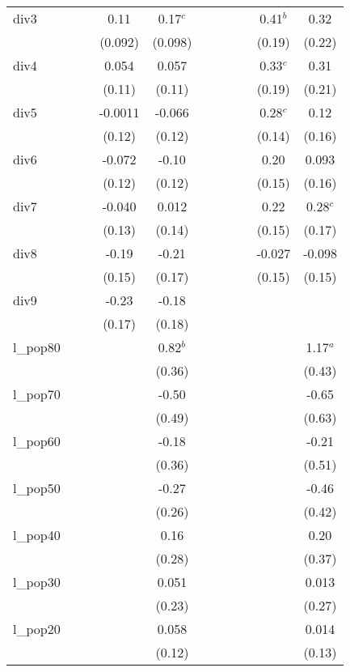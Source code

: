\documentclass[]{article}
\begin{document}
\begin{tabular}{lcccccccccc}
div3 &  &  & 0.11 & 0.17$^c$ &  &  &  &  & 0.41$^b$ & 0.32 \\
 &  &  & (0.092) & (0.098) &  &  &  &  & (0.19) & (0.22) \\
div4 &  &  & 0.054 & 0.057 &  &  &  &  & 0.33$^c$ & 0.31 \\
 &  &  & (0.11) & (0.11) &  &  &  &  & (0.19) & (0.21) \\
div5 &  &  & -0.0011 & -0.066 &  &  &  &  & 0.28$^c$ & 0.12 \\
 &  &  & (0.12) & (0.12) &  &  &  &  & (0.14) & (0.16) \\
div6 &  &  & -0.072 & -0.10 &  &  &  &  & 0.20 & 0.093 \\
 &  &  & (0.12) & (0.12) &  &  &  &  & (0.15) & (0.16) \\
div7 &  &  & -0.040 & 0.012 &  &  &  &  & 0.22 & 0.28$^c$ \\
 &  &  & (0.13) & (0.14) &  &  &  &  & (0.15) & (0.17) \\
div8 &  &  & -0.19 & -0.21 &  &  &  &  & -0.027 & -0.098 \\
 &  &  & (0.15) & (0.17) &  &  &  &  & (0.15) & (0.15) \\
div9 &  &  & -0.23 & -0.18 &  &  &  &  &  &  \\
 &  &  & (0.17) & (0.18) &  &  &  &  &  &  \\
l\_pop80 &  &  &  & 0.82$^b$ &  &  &  &  &  & 1.17$^a$ \\
 &  &  &  & (0.36) &  &  &  &  &  & (0.43) \\
l\_pop70 &  &  &  & -0.50 &  &  &  &  &  & -0.65 \\
 &  &  &  & (0.49) &  &  &  &  &  & (0.63) \\
l\_pop60 &  &  &  & -0.18 &  &  &  &  &  & -0.21 \\
 &  &  &  & (0.36) &  &  &  &  &  & (0.51) \\
l\_pop50 &  &  &  & -0.27 &  &  &  &  &  & -0.46 \\
 &  &  &  & (0.26) &  &  &  &  &  & (0.42) \\
l\_pop40 &  &  &  & 0.16 &  &  &  &  &  & 0.20 \\
 &  &  &  & (0.28) &  &  &  &  &  & (0.37) \\
l\_pop30 &  &  &  & 0.051 &  &  &  &  &  & 0.013 \\
 &  &  &  & (0.23) &  &  &  &  &  & (0.27) \\
l\_pop20 &  &  &  & 0.058 &  &  &  &  &  & 0.014 \\
 &  &  &  & (0.12) &  &  &  &  &  & (0.13) \\

\end{tabular}
\end{document}
